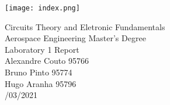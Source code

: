 
\thispagestyle {empty}

\texttt{[image: index.png]}

\begin{center}
%
\vspace{3.0cm}

\vspace{1cm}
{\FontLb Circuits Theory and Eletronic Fundamentals} \\ %
\vspace{1cm}
{\FontSn Aerospace Engineering Master's Degree} \\ %
\vspace{1cm}
{\FontSn Laboratory 1 Report } \\
\vspace{1cm}
{\FontSn Alexandre Couto 95766} \\
\vspace{0.1cm}
{\FontSn Bruno Pinto     95774} \\
\vspace{0.1cm}
{\FontSn Hugo Aranha     95796} \\
\vspace{0.1cm}
{/03/2021} \\ %
%
\end{center}

